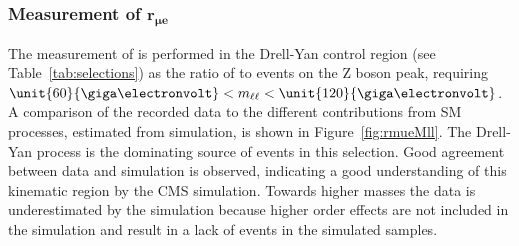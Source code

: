 \subsubsection{Measurement of $\mathbf{r_{\mu e}}$}
The measurement of \rmue is performed in the Drell-Yan control region (see Table~\ref{tab:selections}) as the ratio of \MM to \EE events on the Z boson peak, requiring $\unit{60}{\giga\electronvolt} < \mll < \unit{120}{\giga\electronvolt}$. A comparison of the recorded data to the different contributions  from SM processes, estimated from simulation, is shown in Figure~\ref{fig:rmueMll}. The Drell-Yan process is the dominating source of events in this selection. Good agreement between data and simulation is observed, indicating a good understanding of this kinematic region by the CMS simulation. Towards higher masses the data is underestimated by the simulation because higher order effects are not included in the simulation and result in a lack of events in the simulated samples.  
